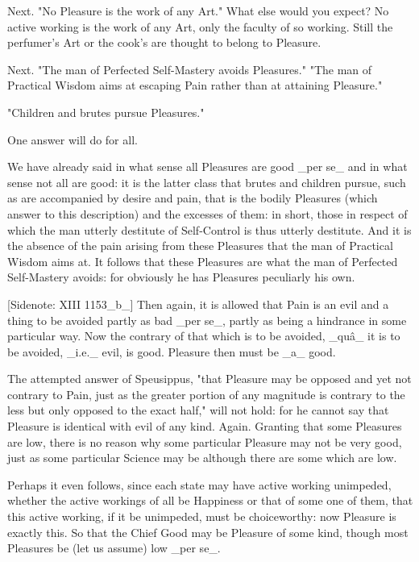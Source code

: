 Next. "No Pleasure is the work of any Art." What else would you expect?
No active working is the work of any Art, only the faculty of so
working. Still the perfumer's Art or the cook's are thought to belong to
Pleasure.

Next. "The man of Perfected Self-Mastery avoids Pleasures." "The man
of Practical Wisdom aims at escaping Pain rather than at attaining
Pleasure."

"Children and brutes pursue Pleasures."

One answer will do for all.

We have already said in what sense all Pleasures are good _per se_ and
in what sense not all are good: it is the latter class that brutes and
children pursue, such as are accompanied by desire and pain, that is the
bodily Pleasures (which answer to this description) and the excesses of
them: in short, those in respect of which the man utterly destitute of
Self-Control is thus utterly destitute. And it is the absence of the
pain arising from these Pleasures that the man of Practical Wisdom
aims at. It follows that these Pleasures are what the man of Perfected
Self-Mastery avoids: for obviously he has Pleasures peculiarly his own.

[Sidenote: XIII 1153_b_] Then again, it is allowed that Pain is an evil
and a thing to be avoided partly as bad _per se_, partly as being a
hindrance in some particular way. Now the contrary of that which is to
be avoided, _quâ_ it is to be avoided, _i.e._ evil, is good. Pleasure
then must be _a_ good.

The attempted answer of Speusippus, "that Pleasure may be opposed and
yet not contrary to Pain, just as the greater portion of any magnitude
is contrary to the less but only opposed to the exact half," will not
hold: for he cannot say that Pleasure is identical with evil of any
kind. Again. Granting that some Pleasures are low, there is no reason
why some particular Pleasure may not be very good, just as some
particular Science may be although there are some which are low.

Perhaps it even follows, since each state may have active working
unimpeded, whether the active workings of all be Happiness or that of
some one of them, that this active working, if it be unimpeded, must be
choiceworthy: now Pleasure is exactly this. So that the Chief Good may
be Pleasure of some kind, though most Pleasures be (let us assume) low
_per se_.

